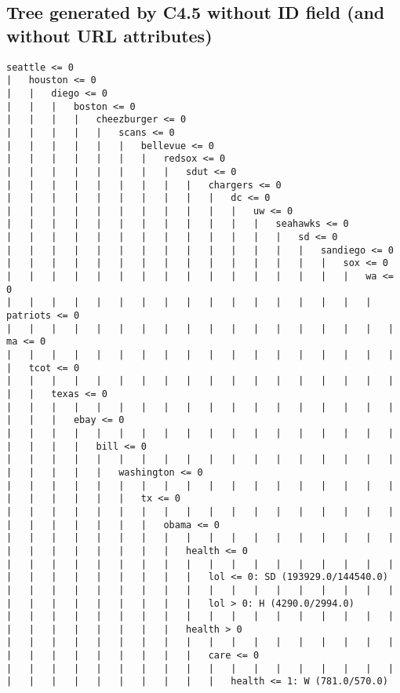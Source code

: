 \documentclass[a4paper]{article}
\begin{document}
\begin{landscape}
\subsection{Tree generated by C4.5 without ID field (and without URL attributes)}
\begin{verbatim}
seattle <= 0
|   houston <= 0
|   |   diego <= 0
|   |   |   boston <= 0
|   |   |   |   cheezburger <= 0
|   |   |   |   |   scans <= 0
|   |   |   |   |   |   bellevue <= 0
|   |   |   |   |   |   |   redsox <= 0
|   |   |   |   |   |   |   |   sdut <= 0
|   |   |   |   |   |   |   |   |   chargers <= 0
|   |   |   |   |   |   |   |   |   |   dc <= 0
|   |   |   |   |   |   |   |   |   |   |   uw <= 0
|   |   |   |   |   |   |   |   |   |   |   |   seahawks <= 0
|   |   |   |   |   |   |   |   |   |   |   |   |   sd <= 0
|   |   |   |   |   |   |   |   |   |   |   |   |   |   sandiego <= 0
|   |   |   |   |   |   |   |   |   |   |   |   |   |   |   sox <= 0
|   |   |   |   |   |   |   |   |   |   |   |   |   |   |   |   wa <= 0
|   |   |   |   |   |   |   |   |   |   |   |   |   |   |   |   |   patriots <= 0
|   |   |   |   |   |   |   |   |   |   |   |   |   |   |   |   |   |   ma <= 0
|   |   |   |   |   |   |   |   |   |   |   |   |   |   |   |   |   |   |   tcot <= 0
|   |   |   |   |   |   |   |   |   |   |   |   |   |   |   |   |   |   |   |   texas <= 0
|   |   |   |   |   |   |   |   |   |   |   |   |   |   |   |   |   |   |   |   |   ebay <= 0
|   |   |   |   |   |   |   |   |   |   |   |   |   |   |   |   |   |   |   |   |   |   bill <= 0
|   |   |   |   |   |   |   |   |   |   |   |   |   |   |   |   |   |   |   |   |   |   |   washington <= 0
|   |   |   |   |   |   |   |   |   |   |   |   |   |   |   |   |   |   |   |   |   |   |   |   tx <= 0
|   |   |   |   |   |   |   |   |   |   |   |   |   |   |   |   |   |   |   |   |   |   |   |   |   obama <= 0
|   |   |   |   |   |   |   |   |   |   |   |   |   |   |   |   |   |   |   |   |   |   |   |   |   |   health <= 0
|   |   |   |   |   |   |   |   |   |   |   |   |   |   |   |   |   |   |   |   |   |   |   |   |   |   |   lol <= 0: SD (193929.0/144540.0)
|   |   |   |   |   |   |   |   |   |   |   |   |   |   |   |   |   |   |   |   |   |   |   |   |   |   |   lol > 0: H (4290.0/2994.0)
|   |   |   |   |   |   |   |   |   |   |   |   |   |   |   |   |   |   |   |   |   |   |   |   |   |   health > 0
|   |   |   |   |   |   |   |   |   |   |   |   |   |   |   |   |   |   |   |   |   |   |   |   |   |   |   care <= 0
|   |   |   |   |   |   |   |   |   |   |   |   |   |   |   |   |   |   |   |   |   |   |   |   |   |   |   |   health <= 1: W (781.0/570.0)

\end{verbatim}
\end{landscape}
\end{document}
